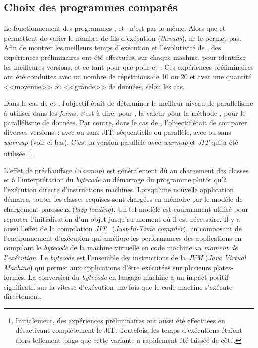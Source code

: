 \subsection{Choix des programmes comparés}

Le fonctionnement des programmes ,  et~ n'est pas le m\^eme. Alors que  et  permettent de varier le nombre de fils d'ex\'ecution (\emph{threads}),  ne le permet pas. Afin de montrer les meilleurs temps d'ex\'ecution et l'\'evolutivit\'e de , des exp\'eriences pr\'eliminaires ont \'et\'e effectu\'ees, sur chaque machine, pour identifier les meilleures versions, et ce tant pour  que pour  et .
Ces exp\'eriences pr\'eliminaires ont \'et\'e conduites avec un nombre de r\'ep\'etitions de 10 ou 20 et avec une quantit\'e <<moyenne>> ou <<grande>> de donn\'ees, selon les cas. 

Dans le cas de  et , l'objectif \'etait de d\'eterminer le meilleur niveau de parall\'elisme \`a utiliser dans les \emph{farm}s, c'est-\`a-dire, pour , la valeur pour la m\'ethode , pour le parall\'elisme de donn\'ees.
%
Par contre, dans le cas de , l'objectif était de comparer diverses versions~: avec ou sans JIT, séquentielle ou parallèle, avec ou sans \emph{warmup} (voir ci-bas).
%
C'est la version parallèle avec \emph{warmup} et \emph{JIT} qui a \'et\'e utilis\'ee.%
%
\footnote{Initialement, des expériences préliminaires ont aussi été
effectuées en désactivant complètement le JIT. Toutefois, les temps
d'exécutions étaient alors tellement longs que cette variante a
rapidement été laissée de côté.}


L'effet de pr\'echauffage (\emph{warmup}) est g\'en\'eralement d\^u au chargement des classes et \`a l'interpr\'etation du \emph{bytecode} au d\'emarrage du programme plutôt qu'à l'exécution directe d'instructions machines. Lorsqu'une nouvelle application d\'emarre, toutes les classes requises sont charg\'ees en m\'emoire par le mod\`ele de chargement paresseux (\emph{lazy loading}). Un tel mod\`ele est couramment utilis\'e pour reporter l'initialisation d'un objet jusqu'au moment o\`u il est n\'ecessaire.
%
\label{jitDescription.sect}
%
Il y a aussi l'effet de la compilation 
\emph{JIT}~\citep{cramer1997compiling} (\emph{Just-In-Time compiler}),
%
un composant de l'environnement d'ex\'ecution  qui am\'eliore les performances des applications en compilant le \emph{bytecode} de la machine virtuelle en code machine \emph{au moment de l'ex\'ecution}. Le \emph{bytecode} est l'ensemble des instructions de la \emph{JVM} (\emph{Java Virtual Machine}) qui permet aux applications d'\^etre ex\'ecut\'ees sur plusieurs plates-formes. La conversion du \emph{bytecode} en langage machine a un impact positif significatif sur la vitesse d'ex\'ecution une fois que le code machine s'exécute directement.

